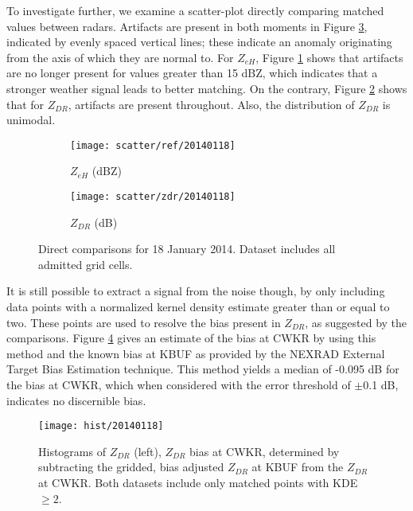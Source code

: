 To investigate further, we examine a scatter-plot directly comparing matched values between radars.
Artifacts are present in both moments in Figure
\ref{fig:scatter_20140118}, indicated by evenly spaced vertical lines; these indicate an anomaly
originating from the axis of which they are normal to. For
$Z_{eH}$, Figure \ref{fig:scatter_ref_20140118} shows that artifacts are no longer present for values
greater than 15 dBZ, which indicates that a
stronger weather signal leads to better matching. On the contrary, Figure \ref{fig:scatter_zdr_20140118}
shows that for $Z_{DR}$, artifacts are present throughout. Also, the distribution of $Z_{DR}$ is unimodal. 

\begin{figure}[H]
\centering
   \begin{subfigure}{0.49\linewidth} \centering
     \texttt{[image: scatter/ref/20140118]}
     \caption{$Z_{eH}$ (dBZ)}\label{fig:scatter_ref_20140118}
   \end{subfigure}
   \begin{subfigure}{0.49\linewidth} \centering
     \texttt{[image: scatter/zdr/20140118]}
     \caption{$Z_{DR}$ (dB)}\label{fig:scatter_zdr_20140118}
   \end{subfigure}
\caption{Direct comparisons for 18 January 2014. Dataset includes all admitted grid cells.} \label{fig:scatter_20140118}
\end{figure}

It is still possible to extract a signal from the noise though, by only including data points with a
normalized kernel density estimate greater than or equal to two. These points are used to resolve the bias present in
$Z_{DR}$, as suggested by the comparisons. Figure \ref{fig:hist_20140118} gives an estimate of the
bias at CWKR by using this method and the known bias at KBUF as provided by the NEXRAD
External Target Bias Estimation technique. This method yields a median of -0.095 dB for the bias at CWKR, which when
considered with the error threshold of $\pm$0.1 dB, indicates no discernible bias.

\begin{figure}[H]
\texttt{[image: hist/20140118]}\centering
\caption{Histograms of $Z_{DR}$ (left), $Z_{DR}$ bias at CWKR, determined by subtracting the gridded, bias adjusted $Z_{DR}$ at KBUF from the $Z_{DR}$ at
CWKR. Both datasets include only matched points with KDE $\geq 2$. } 
\label{fig:hist_20140118}
\end{figure}



